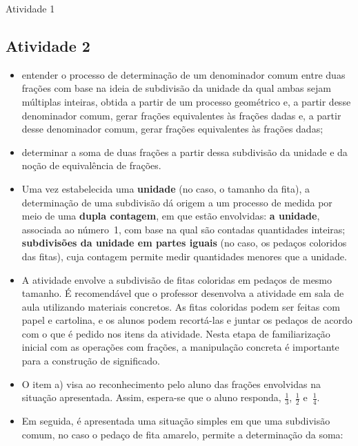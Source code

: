 \begin{multicols}{2}
\begin{resposta*}{Atividade 1}
\end{resposta*}


\subsection{Atividade 2}

  \newline \vspace{.15cm}

\begin{itemize} %
    \item       entender o processo de determinação de um denominador comum entre duas frações com base na ideia de subdivisão da unidade da qual ambas sejam múltiplas inteiras, obtida a partir de um processo geométrico e, a partir desse denominador comum, gerar frações equivalentes às frações dadas e, a partir desse denominador comum, gerar frações equivalentes às frações dadas;
    \item       determinar a soma de duas frações a partir dessa subdivisão da unidade e da noção de equivalência de frações.
\end{itemize} %


   \vspace{.15cm}

\begin{itemize} %
    \item       Uma vez estabelecida uma       {\bf unidade}       (no caso, o tamanho da fita), a determinação de uma subdivisão dá origem a um processo de medida por meio de uma       {\bf dupla contagem}, em que estão envolvidas:       {\bf a unidade}, associada ao número~1, com base na qual são contadas quantidades inteiras;       {\bf subdivisões da unidade em partes iguais}       (no caso, os pedaços coloridos das fitas), cuja contagem permite medir quantidades menores que a unidade.
    \item       A atividade envolve a subdivisão de fitas coloridas em pedaços de mesmo tamanho. É recomendável que o professor desenvolva a atividade em sala de aula utilizando materiais concretos. As fitas coloridas podem ser feitas com papel e cartolina, e os alunos podem recortá-las e juntar os pedaços de acordo com o que é pedido nos itens da atividade. Nesta etapa de familiarização inicial com as operações com frações, a manipulação concreta é importante para a construção de significado.
    \item       O item a) visa ao reconhecimento pelo aluno das frações envolvidas na situação apresentada. Assim, espera-se que o aluno responda,       $\frac{1}{3}$,       $\frac{1}{2}$       e~$\frac{1}{4}$.
    \item       Em seguida, é apresentada uma situação simples em que uma subdivisão comum, no caso o pedaço de fita amarelo, permite a determinação da soma:
\end{itemize} %


\end{multicols}

